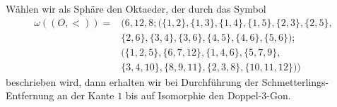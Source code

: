 \documentclass[12pt,titlepage,twoside,cleardoublepage]{article}
\theoremstyle{nummermitklammern}
\numberwithin{equation}{section}
\begin{document}

 Wählen wir als Sphäre den Oktaeder, der durch das Symbol
 \begin{align*}
 \omega((O,<))=&(6,12,8;(\{1,2\},\{1,3\},\{1,4\},\{1,5\},\{2,3\},\{2,5\},\\
 &\{2,6\},\{3,4\},\{3,6\},\{4,5\},\{4,6\},\{5,6\});\\
 &(\{1,2,5\},\{6,7,12\},\{1,4,6\},\{5,7,9\},\\&\{3,4,10\},\{8,9,11\},\{2,3,8\},\{10,11,12\}))
 \end{align*}
 beschrieben wird, dann erhalten wir bei Durchführung der Schmetterlings-Entfernung an der Kante $1$ bis auf Isomorphie den Doppel-3-Gon. 

\end{document}
